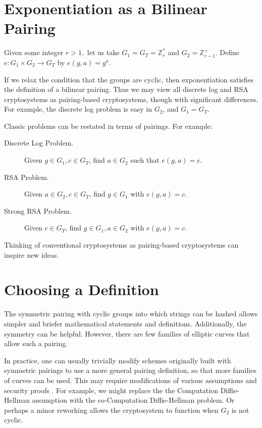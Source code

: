 \section{Exponentiation as a Bilinear Pairing}

Given some integer $r > 1,$
let us take $G_1 = G_T = \mathbb{Z}_r^*$ and $G_2 = \mathbb{Z}_{r-1}^+$.
Define $e:G_1\times G_2 \rightarrow G_T$ by $e(g, a)= g^a$.

If we relax the condition that the groups are cyclic, then exponentiation
satisfies the definition of a bilinear pairing. Thus we may view all discrete
log and RSA cryptosystems as pairing-based cryptosystems, though with
significant differences. For example, the discrete log problem
is easy in $G_2$, and $G_1 = G_T$.

Classic problems can be restated in terms of pairings. For example:

\begin{description}
\item[Discrete Log Problem.]
Given $g \in G_1, c \in G_T$, find $a \in G_2$ such that $e(g,a) = c$.
\item[RSA Problem.]
Given $a \in G_2, c \in G_T$, find $g \in G_1$ with
$e(g,a) = c$.
\item[Strong RSA Problem.]
Given $c \in G_T$, find $g \in G_1, a\in G_2$ with
$e(g,a) = c$.
\end{description}

Thinking of conventional cryptosystems as pairing-based cryptosystems can
inspire new ideas.

\section{Choosing a Definition}

The symmetric pairing with cyclic groups into which strings can be hashed
allows simpler and briefer mathematical statements and definitions.
Additionally, the symmetry can be helpful. However, there are few families of
elliptic curves that allow such a pairing.

In practice, one can usually trivially modify schemes originally built with
symmetric pairings to use a more general pairing definition, so that more
families of curves can be used. This may require modifications of various
assumptions and security proofs . For example, we might replace the the
Computation Diffie-Hellman assumption with the co-Computation Diffie-Hellman
problem. Or perhaps a minor reworking allows the cryptosystem to function when
$G_2$ is not cyclic.

